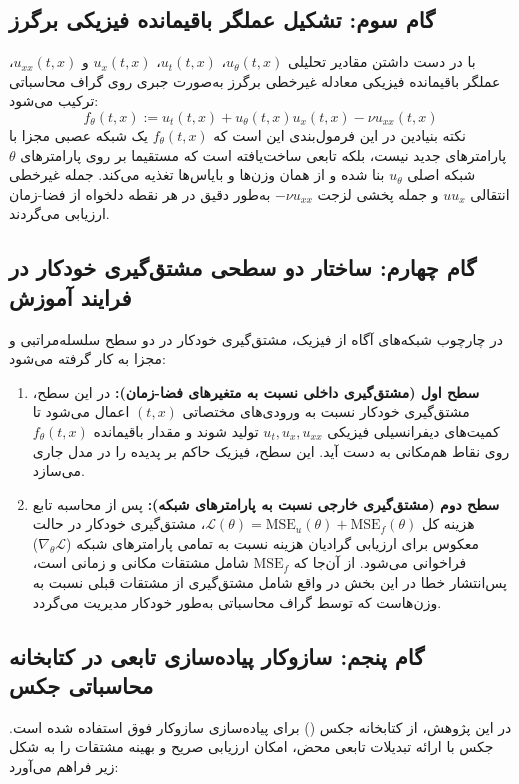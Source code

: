 \subsection{گام سوم: تشکیل عملگر باقیمانده فیزیکی برگرز}
با در دست داشتن مقادیر تحلیلی $u_\theta(t,x)$، $u_t(t,x)$، $u_x(t,x)$ و $u_{xx}(t,x)$، عملگر باقیمانده فیزیکی معادله غیرخطی برگرز به‌صورت جبری روی گراف محاسباتی ترکیب می‌شود:
\begin{equation}
f_\theta(t,x) := u_t(t,x) + u_\theta(t,x) u_x(t,x) - \nu u_{xx}(t,x)
\label{eq:burgers-residual-explicit}
\end{equation}
نکته بنیادین در این فرمول‌بندی این است که $f_\theta(t,x)$ یک شبکه عصبی مجزا با پارامترهای جدید نیست، بلکه تابعی ساخت‌یافته است که مستقیما بر روی پارامترهای $\theta$ شبکه اصلی $u_\theta$ بنا شده و از همان وزن‌ها و بایاس‌ها تغذیه می‌کند. جمله غیرخطی انتقالی $u u_x$ و جمله پخشی لزجت $-\nu u_{xx}$ به‌طور دقیق در هر نقطه دلخواه از فضا-زمان ارزیابی می‌گردند.

\subsection{گام چهارم: ساختار دو سطحی مشتق‌گیری خودکار در فرایند آموزش}
در چارچوب شبکه‌های آگاه از فیزیک، مشتق‌گیری خودکار در دو سطح سلسله‌مراتبی و مجزا به کار گرفته می‌شود:

\begin{enumerate}
\item \textbf{سطح اول (مشتق‌گیری داخلی نسبت به متغیرهای فضا-زمان):} در این سطح، مشتق‌گیری خودکار نسبت به ورودی‌های مختصاتی $(t,x)$ اعمال می‌شود تا کمیت‌های دیفرانسیلی فیزیکی $u_t, u_x, u_{xx}$ تولید شوند و مقدار باقیمانده $f_\theta(t,x)$ روی نقاط هم‌مکانی به دست آید. این سطح، فیزیک حاکم بر پدیده را در مدل جاری می‌سازد.
\item \textbf{سطح دوم (مشتق‌گیری خارجی نسبت به پارامترهای شبکه):} پس از محاسبه تابع هزینه کل $\mathcal{L}(\theta) = \mathrm{MSE}_u(\theta) + \mathrm{MSE}_f(\theta)$، مشتق‌گیری خودکار در حالت معکوس برای ارزیابی گرادیان هزینه نسبت به تمامی پارامترهای شبکه ($\nabla_\theta \mathcal{L}$) فراخوانی می‌شود. از آن‌جا که $\mathrm{MSE}_f$ شامل مشتقات مکانی و زمانی است، پس‌انتشار خطا در این بخش در واقع شامل مشتق‌گیری از مشتقات قبلی نسبت به وزن‌هاست که توسط گراف محاسباتی به‌طور خودکار مدیریت می‌گردد.
\end{enumerate}

\subsection{گام پنجم: سازوکار پیاده‌سازی تابعی در کتابخانه محاسباتی جکس}
در این پژوهش، از کتابخانه جکس () برای پیاده‌سازی سازوکار فوق استفاده شده است. جکس با ارائه تبدیلات تابعی محض، امکان ارزیابی صریح و بهینه مشتقات را به شکل زیر فراهم می‌آورد:

